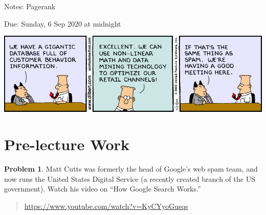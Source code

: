 \documentclass[10pt]{article}
\theoremstyle{definition}
\newtheorem{problem}{Problem}
\begin{document}
\begin{center}
{
\Huge
Notes: Pagerank
}

\vspace{0.15in}
Due: Sunday, 6 Sep 2020 at midnight
\end{center}

\begin{center}
\includegraphics[width=\textwidth]{dilbert}
\end{center}

\section{Pre-lecture Work}

\begin{problem}
    Matt Cutts was formerly the head of Google's web spam team,
    and now runs the United States Digital Service (a recently created branch of the US government).
    Watch his video on ``How Google Search Works.''
    \begin{quote}
    \url{https://www.youtube.com/watch?v=KyCYyoGusqs}
    \end{quote}
\end{problem}
\end{document}
